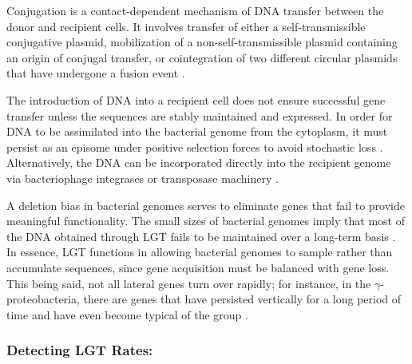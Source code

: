 \documentclass[english]{article}
\begin{document}
Conjugation is a contact-dependent mechanism of
DNA transfer between the donor and recipient cells. It involves
transfer of either a self-transmissible conjugative plasmid, mobilization of a
non-self-transmissible plasmid containing an origin of conjugal transfer,
or cointegration of two different circular plasmids that have undergone
a fusion event \citep{Davi:99}.

The introduction of DNA into a recipient cell does not ensure
successful gene transfer unless the  sequences are stably
maintained and expressed. In order for DNA to be assimilated into
the bacterial genome from the cytoplasm, it must persist as an
episome under positive selection forces to avoid stochastic loss
\citep{Ochm:00}. Alternatively, the DNA can be incorporated directly
into the recipient genome via bacteriophage integrases or transposase
machinery \citep{Ochm:00}.

A deletion bias in bacterial genomes serves to eliminate genes that fail to
provide meaningful functionality. The small sizes of bacterial genomes
imply that most of the DNA obtained through LGT fails to be maintained
over a long-term basis \citep{Raga:09}. In essence, LGT functions in
allowing bacterial genomes to sample rather than accumulate sequences,
since gene acquisition must be balanced with gene loss. This being
said, not all lateral genes turn over rapidly; for instance, in the
$\gamma$-proteobacteria, there are genes that have persisted vertically
for a long period of time and have even become typical of the group
\citep{Raga:09}.

\subsubsection{Detecting LGT Rates:}
\end{document}
